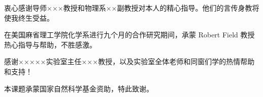 
\begin{acknowledgements}
  衷心感谢导师×××教授和物理系××副教授对本人的精心指导。他们的言传身教将使我终生受益。

  在美国麻省理工学院化学系进行九个月的合作研究期间，承蒙 Robert Field 教授热心指导与帮助，不胜感激。

  感谢×××××实验室主任×××教授，以及实验室全体老师和同窗们学的热情帮助和支持！

  本课题承蒙国家自然科学基金资助，特此致谢。
\end{acknowledgements}
